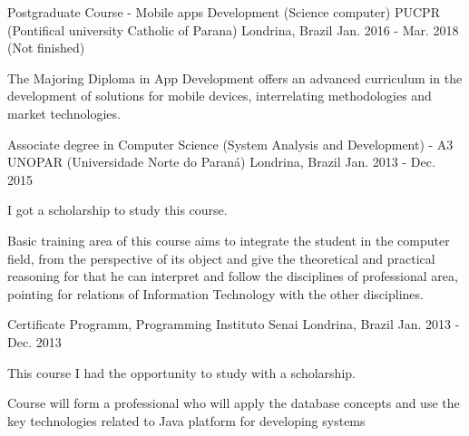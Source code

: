 

\begin{cventries}

  \cventry
    {Postgraduate Course - Mobile apps Development (Science computer)} %
    {PUCPR (Pontifical university Catholic of Parana)} %
    {Londrina, Brazil} %
    {Jan. 2016 - Mar. 2018 (Not finished)} %
    {
      \begin{cvitems} %
\item {The Majoring Diploma in App Development offers an advanced curriculum in the development of solutions for mobile devices, interrelating methodologies and market technologies.}
      \end{cvitems}
    }



  \cventry
    {Associate degree in Computer Science (System Analysis and Development) - A3} %
    {UNOPAR (Universidade Norte do Paraná)} %
    {Londrina, Brazil} %
    {Jan. 2013 - Dec. 2015} %
    {
      \begin{cvitems} %
        \item {I got a scholarship to study this course.}
\item {Basic training area of this course aims to integrate the student in the computer field, from the perspective of its object and give the theoretical and practical reasoning for that he can interpret and follow the disciplines of professional area, pointing for relations of Information Technology with the other disciplines.}
      \end{cvitems}
    }
    
  \cventry
    {Certificate Programm, Programming} %
    {Instituto Senai} %
    {Londrina, Brazil} %
    {Jan. 2013 - Dec. 2013} %
    {
      \begin{cvitems} %
        \item {This course I had the opportunity to study with a scholarship.}
\item {Course will form a professional who will apply the database concepts and use the key technologies related to Java platform for developing systems}
      \end{cvitems}
    }
\end{cventries}
